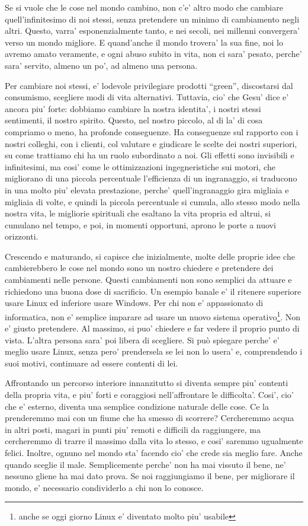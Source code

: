 Se si vuole che le cose nel mondo cambino, non c'e' altro modo che cambiare quell'infinitesimo di noi stessi, senza pretendere un minimo di cambiamento negli altri. Questo, varra' esponenzialmente tanto, e nei secoli, nei millenni convergera' verso un mondo migliore. E quand'anche il mondo trovera' la sua fine, noi lo avremo amato veramente, e ogni abuso subito in vita, non ci sara' pesato, perche' sara' servito, almeno un po', ad almeno una persona.

Per cambiare noi stessi, e' lodevole privilegiare prodotti ``green'', discostarsi dal consumismo, scegliere modi di vita alternativi. Tuttavia, cio' che Gesu' dice e' ancora piu' forte: dobbiamo cambiare la nostra identita', i nostri stessi sentimenti, il nostro spirito. Questo, nel nostro piccolo, al di la' di cosa compriamo o meno, ha profonde conseguenze. Ha conseguenze sul rapporto con i nostri colleghi, con i clienti, col valutare e giudicare le scelte dei nostri superiori, su come trattiamo chi ha un ruolo subordinato a noi. Gli effetti sono invisibili e infinitesimi, ma cosi' come le ottimizzazioni ingegneristiche sui motori, che migliorano di una piccola percentuale l'efficienza di un ingranaggio, si traducono in una molto piu' elevata prestazione, perche' quell'ingranaggio gira migliaia e migliaia di volte, e quindi la piccola percentuale si cumula, allo stesso modo nella nostra vita, le migliorie spirituali che esaltano la vita propria ed altrui, si cumulano nel tempo, e poi, in momenti opportuni, aprono le porte a nuovi orizzonti.

Crescendo e maturando, si capisce che inizialmente, molte delle proprie idee che cambierebbero le cose nel mondo sono un nostro chiedere e pretendere dei cambiamenti nelle persone. Questi cambiamenti non sono semplici da attuare e richiedono una buona dose di sacrificio. Un esempio banale e' il ritenere superiore usare Linux ed inferiore usare Windows. Per chi non e' appassionato di informatica, non e' semplice imparare ad usare un nuovo sistema operativo\footnote{anche se oggi giorno Linux e' diventato molto piu' usabile}.
Non e' giusto pretendere. Al massimo, si puo' chiedere e far vedere il proprio punto di vista. L'altra persona sara' poi libera di scegliere. Si può spiegare perche' e' meglio usare Linux, senza pero' prendersela se lei non lo usera' e, comprendendo i suoi motivi, continuare ad essere contenti di lei.

Affrontando un percorso interiore innanzitutto si diventa sempre piu' contenti della propria vita, e piu' forti e coraggiosi nell'affrontare le difficolta'. Cosi', cio' che e' esterno, diventa una semplice condizione naturale delle cose. Ce la prenderemmo mai con un fiume che ha smesso di scorrere? Cercheremmo acqua in altri posti, magari in punti piu' remoti e difficili da raggiungere, ma cercheremmo di trarre il massimo dalla vita lo stesso, e cosi' saremmo ugualmente felici. 
Inoltre, ognuno nel mondo sta' facendo cio' che crede sia meglio fare. Anche quando sceglie il male. Semplicemente perche' non ha mai vissuto il bene, ne' nessuno gliene ha mai dato prova. 
Se noi raggiungiamo il bene, per migliorare il mondo, e' necessario condividerlo a chi non lo conosce.

